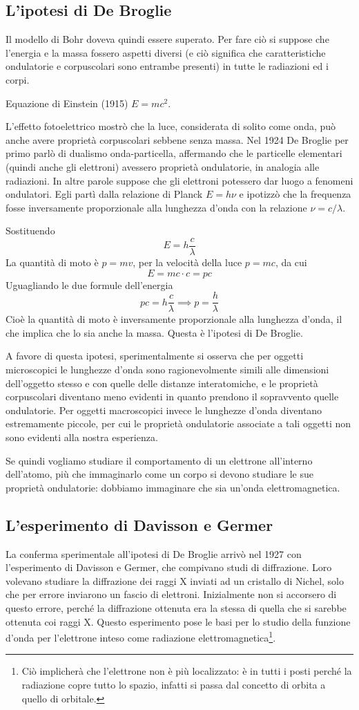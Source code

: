 \subsection{L'ipotesi di De Broglie}
Il modello di Bohr doveva quindi essere superato. Per fare ciò si suppose che l'energia e la massa fossero aspetti diversi (e ciò significa che caratteristiche ondulatorie e corpuscolari sono entrambe presenti) in tutte le radiazioni ed i corpi.

Equazione di Einstein (1915) $E=mc^2$.

L'effetto fotoelettrico mostrò che la luce, considerata di solito come onda, può anche avere proprietà corpuscolari sebbene senza massa. Nel 1924 De Broglie per primo parlò di dualismo onda-particella, affermando che le particelle elementari (quindi anche gli elettroni) avessero proprietà ondulatorie, in analogia alle radiazioni. In altre parole suppose che gli elettroni potessero dar luogo a fenomeni ondulatori. Egli partì dalla relazione di Planck $E=h\nu$ e ipotizzò che la frequenza fosse inversamente proporzionale alla lunghezza d'onda con la relazione $\nu=c/\lambda$. 

Sostituendo
$$E=h\frac{c}{\lambda}$$
La quantità di moto è $p=mv$, per la velocità della luce $p=mc$, da cui
$$E=mc \cdot c=pc$$
Uguagliando le due formule dell'energia
$$pc=h\frac{c}{\lambda} \implies p=\frac{h}{\lambda}$$
Cioè la quantità di moto è inversamente proporzionale alla lunghezza d'onda, il che implica che lo sia anche la massa. Questa è l'ipotesi di De Broglie.

A favore di questa ipotesi, sperimentalmente si osserva che per oggetti microscopici le lunghezze d'onda sono ragionevolmente simili alle dimensioni dell'oggetto stesso e con quelle delle distanze interatomiche, e le proprietà corpuscolari diventano meno evidenti in quanto prendono il sopravvento quelle ondulatorie. Per oggetti macroscopici invece le lunghezze d'onda diventano estremamente piccole, per cui le proprietà ondulatorie associate a tali oggetti non sono evidenti alla nostra esperienza.

Se quindi vogliamo studiare il comportamento di un elettrone all'interno dell'atomo, più che immaginarlo come un corpo si devono studiare le sue proprietà ondulatorie: dobbiamo immaginare che sia un'onda elettromagnetica.
\subsection{L'esperimento di Davisson e Germer}
La conferma sperimentale all'ipotesi di De Broglie arrivò nel 1927 con l'esperimento di Davisson e Germer, che compivano studi di diffrazione. Loro volevano studiare la diffrazione dei raggi X inviati ad un cristallo di Nichel, solo che per errore inviarono un fascio di elettroni. Inizialmente non si accorsero di questo errore, perché la diffrazione ottenuta era la stessa di quella che si sarebbe ottenuta coi raggi X.
Questo esperimento pose le basi per lo studio della funzione d'onda per l'elettrone inteso come radiazione elettromagnetica\footnote{Ciò implicherà che l'elettrone non è più localizzato: è in tutti i posti perché la radiazione copre tutto lo spazio, infatti si passa dal concetto di orbita a quello di orbitale.}.


